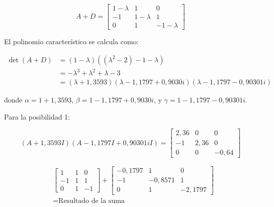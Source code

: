 \documentclass{report}
\begin{document}
\begin{enumerate}
\begin{enumerate}
                \[
                A + D = \begin{bmatrix}
                1-\lambda & 1 & 0 \\
                -1 & 1-\lambda & 1 \\
                0 & 1 & -1-\lambda
                \end{bmatrix}
                \]
                
                El polinomio característico se calcula como:
                
                \[
                \begin{aligned}
                \det(A + D) &= (1-\lambda)((\lambda^{2}-2)-1-\lambda) \\
                &= -\lambda^{3}+\lambda^{2}+\lambda-3 \\
                &= (\lambda+1,3593)(\lambda-1,1797+0,9030 i)(\lambda-1,1797-0,90301 i)
                \end{aligned}
                \]
                
                donde $\alpha = 1+1,3593$, $\beta = 1-1,1797+0,9030 i$, y $\gamma = 1-1,1797-0,90301 i$.
                
                Para la posibilidad 1:
                
                \[
                (A+1,3593 I)(A-1,1797 I+0,90301 i I) = \begin{bmatrix}
                2,36 & 0 & 0 \\
                -1 & 2,36 & 0 \\
                0 & 0 & -0,64
                \end{bmatrix}
                \]
                
                \[
                \begin{aligned}
                & \begin{bmatrix}
                1 & 1 & 0 \\
                -1 & 1 & 1 \\
                0 & 1 & -1
                \end{bmatrix} + \begin{bmatrix}
                -0,1797 & 1 & 0 \\
                -1 & -0,8571 & 1 \\
                0 & 1 & -2,1797
                \end{bmatrix} \\
                & = \text{Resultado de la suma}
                \end{aligned}
                \]


\end{enumerate}
\end{enumerate}
\end{document}
